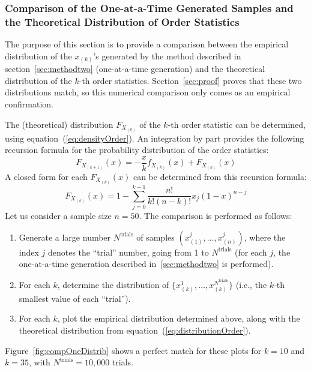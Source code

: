 \documentclass[12pt]{article} %
\begin{document}
\subsubsection{Comparison of the One-at-a-Time Generated Samples and the Theoretical Distribution of Order Statistics}
The purpose of this section is to provide a comparison between the empirical distribution of the $x_{(k)}$'s generated by the method described in section~\ref{sec:methodtwo} (one-at-a-time generation) and the theoretical distribution of the $k$-th order statistics. Section~\ref{sec:proof} proves that these two distributions match, so this numerical comparison only comes as an empirical confirmation.\par
The (theoretical) distribution $F_{X_{(k)}}$ of the $k$-th order statistic can be determined, using equation~(\ref{eq:densityOrder}). An integration by part provides the following recursion formula for the probability distribution of the order statistics:
\begin{equation}
F_{X_{(k+1)}}(x) = -\frac{x}{k} f_{X_{(k)}}(x) + F_{X_{(k)}}(x)
\end{equation}
A closed form for each $F_{X_{(k)}}(x)$ can be determined from this recursion formula:
\begin{equation}\label{eq:distributionOrder}
F_{X_{(k)}}(x) = 1 - \sum_{j=0}^{k-1} \frac{n!}{k!(n-k)!}x_j(1-x)^{n-j}
\end{equation}
Let us consider a sample size $n=50$. The comparison is performed as follows:
\begin{enumerate}
\item Generate a large number $N^\text{trials}$ of samples $(x^j_{(1)},\ldots,x^j_{(n)})$, where the index $j$ denotes the ``trial'' number, going from 1 to $N^\text{trials}$ (for each $j$, the one-at-a-time generation described in~\ref{sec:methodtwo} is performed).
\item For each $k$, determine the distribution of $\{x^1_{(k)},\ldots,x^{N^\text{trials}}_{(k)}\}$ (i.e., the $k$-th smallest value of each ``trial'').
\item For each $k$, plot the empirical distribution determined above, along with the theoretical distribution from equation~(\ref{eq:distributionOrder}).
\end{enumerate}
Figure~\ref{fig:compOneDistrib} shows a perfect match for these plots for $k=10$ and $k=35$, with $N^\text{trials}=10,000$ trials.
\end{document}
